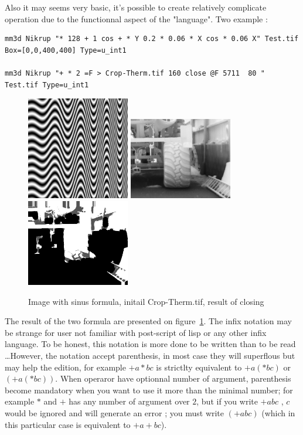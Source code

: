 Also it may seems very basic, it's possible to create relatively complicate
operation due to the functionnal aspect of the "language".  Two example :


\begin{verbatim}
mm3d Nikrup "* 128 + 1 cos + * Y 0.2 * 0.06 * X cos * 0.06 X" Test.tif Box=[0,0,400,400] Type=u_int1

mm3d Nikrup "+ * 2 =F > Crop-Therm.tif 160 close @F 5711  80 " Test.tif Type=u_int1
\end{verbatim}



\begin{figure}
\begin{center}
\includegraphics[width=45mm]{FIGS/ImNikrup/Sin.jpg}
\includegraphics[width=45mm]{FIGS/ImNikrup/CropTrac.jpg}
\includegraphics[width=45mm]{FIGS/ImNikrup/CloseTrac.jpg}
\end{center}
\caption{Image with sinus formula, initail Crop-Therm.tif, result of closing}
\label{FIG:Nikrup1}
\end{figure}


The result of the two formula are presented on figure~\ref{FIG:Nikrup1}. The
infix notation may be strange for user not familiar with post-script of lisp or
any other infix language. To be honest, this notation is more done to be 
written than to be read  \dots However, the notation accept parenthesis,
in most case they will superflous but may help the edition, for example
$+ a * b c$ is strictlty equivalent to $+ a (* b c)$ or $(+ a (* b c))$.
When operaror have optionnal number of argument, parenthesis become
mandatory when you want to use it more than the minimal number; for
example $*$ and $+$ has any number of argument over $2$, but if you
write $+ a  b c$ , $c$ would be ignored and will generate an error ;
you must write $(+ a b c)$ (which in this particular case is equivalent to $+ a + b c$).

